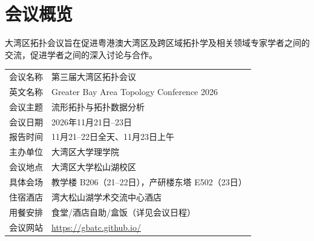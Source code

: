 \documentclass[12pt,a4paper,twoside,UTF8,fontset=none]{ctexart}
\begin{document}
\thispagestyle{empty}
\null
\clearpage
{}
\hypersetup{pageanchor=true}
\section{会议概览}

大湾区拓扑会议旨在促进粤港澳大湾区及跨区域拓扑学及相关领域专家学者之间的交流，促进学者之间的深入讨论与合作。

\vspace{0.8em}
\renewcommand{\arraystretch}{1.45}
\noindent
\begin{tabularx}{\textwidth}{B{3.2cm}Y}
  \toprule
  会议名称 & 第三届大湾区拓扑会议\\
  英文名称 & Greater Bay Area Topology Conference 2026\\
  会议主题 & 流形拓扑与拓扑数据分析\\
  会议日期 & 2026年11月21日--23日\\
  报告时间 & 11月21--22日全天、11月23日上午\\
  主办单位 & 大湾区大学理学院\\
  会议地点 & 大湾区大学松山湖校区\\
  具体会场 & 教学楼 B206（21--22日），产研楼东塔 E502（23日） \\
  住宿酒店 & 湾大松山湖学术交流中心酒店\\
  用餐安排 & 食堂/酒店自助/盒饭（详见会议日程）\\
  会议网站 & \href{https://gbatc.github.io}{https://gbatc.github.io/}\\
  \bottomrule
\end{tabularx}

\vspace{1.2em}
\noindent
{}
\end{document}
